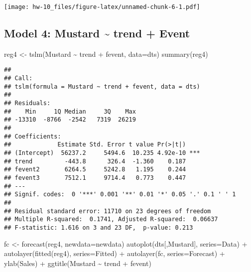 \documentclass[
]{article}
\newenvironment{Shaded}{\begin{snugshade}}{\end{snugshade}}
\newcommand{\AttributeTok}[1]{\textcolor[rgb]{0.77,0.63,0.00}{#1}}
\newcommand{\FunctionTok}[1]{\textcolor[rgb]{0.00,0.00,0.00}{#1}}
\newcommand{\NormalTok}[1]{#1}
\newcommand{\OtherTok}[1]{\textcolor[rgb]{0.56,0.35,0.01}{#1}}
\newcommand{\SpecialCharTok}[1]{\textcolor[rgb]{0.00,0.00,0.00}{#1}}
\newcommand{\StringTok}[1]{\textcolor[rgb]{0.31,0.60,0.02}{#1}}
\begin{document}
\texttt{[image: hw-10\_files/figure-latex/unnamed-chunk-6-1.pdf]}

\hypertarget{model-4-mustard-trend-event}{%
\subsection{Model 4: Mustard \textasciitilde{} trend +
Event}\label{model-4-mustard-trend-event}}

\begin{Shaded}
\begin{Highlighting}[]
\NormalTok{reg4 }\OtherTok{\textless{}{-}} \FunctionTok{tslm}\NormalTok{(Mustard }\SpecialCharTok{\textasciitilde{}}\NormalTok{ trend }\SpecialCharTok{+}\NormalTok{ fevent, }\AttributeTok{data=}\NormalTok{dts)}
\FunctionTok{summary}\NormalTok{(reg4)}
\end{Highlighting}
\end{Shaded}

\begin{verbatim}
## 
## Call:
## tslm(formula = Mustard ~ trend + fevent, data = dts)
## 
## Residuals:
##    Min     1Q Median     3Q    Max 
## -13310  -8766  -2542   7319  26219 
## 
## Coefficients:
##             Estimate Std. Error t value Pr(>|t|)    
## (Intercept)  56237.2     5494.6  10.235 4.92e-10 ***
## trend         -443.8      326.4  -1.360    0.187    
## fevent2       6264.5     5242.8   1.195    0.244    
## fevent3       7512.1     9714.4   0.773    0.447    
## ---
## Signif. codes:  0 '***' 0.001 '**' 0.01 '*' 0.05 '.' 0.1 ' ' 1
## 
## Residual standard error: 11710 on 23 degrees of freedom
## Multiple R-squared:  0.1741, Adjusted R-squared:  0.06637 
## F-statistic: 1.616 on 3 and 23 DF,  p-value: 0.213
\end{verbatim}

\begin{Shaded}
\begin{Highlighting}[]
\NormalTok{fc }\OtherTok{\textless{}{-}} \FunctionTok{forecast}\NormalTok{(reg4, }\AttributeTok{newdata=}\NormalTok{newdata)}
\FunctionTok{autoplot}\NormalTok{(dts[,}\StringTok{\textquotesingle{}Mustard\textquotesingle{}}\NormalTok{], }\AttributeTok{series=}\StringTok{\textquotesingle{}Data\textquotesingle{}}\NormalTok{) }\SpecialCharTok{+}
  \FunctionTok{autolayer}\NormalTok{(}\FunctionTok{fitted}\NormalTok{(reg4), }\AttributeTok{series=}\StringTok{\textquotesingle{}Fitted\textquotesingle{}}\NormalTok{) }\SpecialCharTok{+}
  \FunctionTok{autolayer}\NormalTok{(fc, }\AttributeTok{series=}\StringTok{\textquotesingle{}Forecast\textquotesingle{}}\NormalTok{) }\SpecialCharTok{+}
  \FunctionTok{ylab}\NormalTok{(}\StringTok{\textquotesingle{}Sales\textquotesingle{}}\NormalTok{) }\SpecialCharTok{+}
  \FunctionTok{ggtitle}\NormalTok{(}\StringTok{\textquotesingle{}Mustard \textasciitilde{} trend + fevent\textquotesingle{}}\NormalTok{)}
\end{Highlighting}
\end{Shaded}
\end{document}
